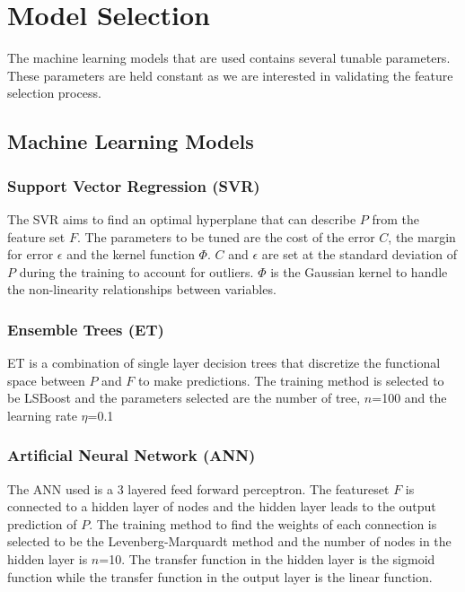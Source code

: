 \documentclass[conference]{IEEEtran}
\begin{document}
\section{Model Selection}\label{msel}
The machine learning models that are used contains several tunable parameters. These parameters are held constant as we are interested in validating the feature selection process.
\subsection{Machine Learning Models}
\subsubsection{Support Vector Regression (SVR)}
The SVR aims to find an optimal hyperplane that can describe $P$ from the feature set $F$\cite{basak2007}. The parameters to be tuned are the cost of the error $C$, the margin for error $\epsilon$ and the kernel function $\Phi$. $C$ and $\epsilon$ are set at the standard deviation of $P$ during the training to account for outliers. $\Phi$ is the Gaussian kernel to handle the non-linearity relationships between variables.  
\subsubsection{Ensemble Trees (ET)}
ET is a combination of single layer decision trees that discretize the functional space between $P$ and $F$ to make predictions. The training method is selected to be LSBoost\cite{friedman2001} and the parameters selected are the number of tree, $n$=100 and the learning rate $\eta$=0.1
\subsubsection{Artificial Neural Network (ANN)}
The ANN used is a 3 layered feed forward perceptron. The featureset $F$ is connected to a hidden layer of nodes and the hidden layer leads to the output prediction of $P$. The training method to find the weights of each connection is selected to be the Levenberg-Marquardt\cite{yu2011} method and the number of nodes in the hidden layer is $n$=10. The transfer function in the hidden layer is the sigmoid function while the transfer function in the output layer is the linear function.
\end{document}
